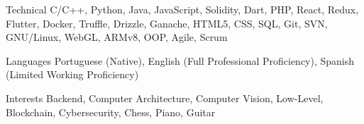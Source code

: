 
\begin{cvskills}
  \cvskill
    {Technical} %
    {C/C++, Python, Java, JavaScript, Solidity, Dart, PHP, React, Redux, Flutter, Docker, Truffle, Drizzle, Ganache, HTML5, CSS, SQL, Git, SVN, GNU/Linux, WebGL, ARMv8, OOP, Agile, Scrum} %

  \cvskill
    {Languages} %
    {Portuguese (Native), English (Full Professional Proficiency), Spanish (Limited Working Proficiency)} %

  \cvskill
    {Interests} %
    {Backend, Computer Architecture, Computer Vision, Low-Level, Blockchain, Cybersecurity, Chess, Piano, Guitar} %
\end{cvskills}
